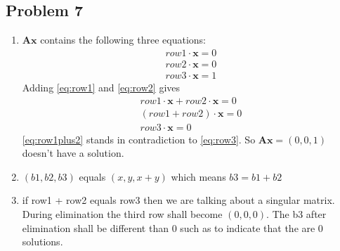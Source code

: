 \documentclass[a4paper,11pt]{article}
\newcommand{\mybf}[1]{\boldsymbol{#1}}
\begin{document}
\subsection*{Problem 7}
\begin{enumerate}[label=\alph*]
\item $\mybf{Ax}$ contains the following three equations:
\begin{subequations}
\begin{align}
   row1 \cdot \mybf{x} = 0\label{eq:row1}\\
   row2 \cdot \mybf{x} = 0\label{eq:row2}\\
   row3 \cdot \mybf{x} = 1\label{eq:row3}
\end{align}
\end{subequations}
Adding \eqref{eq:row1} and \eqref{eq:row2} gives 
\begin{subequations}
\begin{align}
   row1 \cdot \mybf{x} + row2 \cdot \mybf{x} = 0\\
   (row1+row2) \cdot \mybf{x} = 0\\
   row3 \cdot \mybf{x} = 0\label{eq:row1plus2}
\end{align}
\end{subequations}
\eqref{eq:row1plus2} stands in contradiction to \eqref{eq:row3}. So  $\mybf{Ax} = (0,0,1)$ doesn't have a solution.
\item $(b1,b2,b3)$ equals $(x,y,x+y)$ which means $b3=b1+b2$
\item if row1 + row2 equals row3 then we are talking about a singular matrix. During elimination the third row shall become $(0,0,0)$. The b3 after elimination shall be different than 0 such as to indicate that the are 0 solutions.
\end{enumerate}
\end{document}
